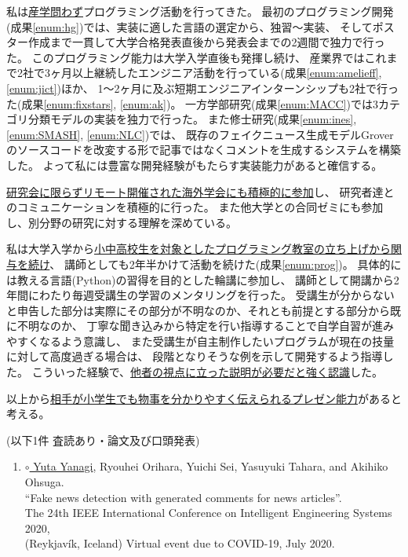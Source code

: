 私は\underline{産学問わず}プログラミング活動を行ってきた。
最初のプログラミング開発(成果\ref{enum:hg})では、実装に適した言語の選定から、独習〜実装、
そしてポスター作成まで一貫して大学合格発表直後から発表会までの2週間で独力で行った。
このプログラミング能力は大学入学直後も発揮し続け、
産業界ではこれまで2社で3ヶ月以上継続したエンジニア活動を行っている(成果\ref{enum:amelieff}, \ref{enum:jict})ほか、
1〜2ヶ月に及ぶ短期エンジニアインターンシップも2社で行った(成果\ref{enum:fixstars}, \ref{enum:ak})。
一方学部研究(成果\ref{enum:MACC})では3カテゴリ分類モデルの実装を独力で行った。
また修士研究(成果\ref{enum:ines}, \ref{enum:SMASH}, \ref{enum:NLC})では、
既存のフェイクニュース生成モデルGrover\cite{grover}のソースコードを改変する形で記事ではなくコメントを生成するシステムを構築した。
よって私には豊富な開発経験がもたらす実装能力があると確信する。

\underline{研究会に限らずリモート開催された海外学会にも積極的に参加}し、
研究者達とのコミュニケーションを積極的に行った。
また他大学との合同ゼミにも参加し、別分野の研究に対する理解を深めている。

私は大学入学から\underline{小中高校生を対象としたプログラミング教室の立ち上げから関与を続け}、
講師としても2年半かけて活動を続けた(成果\ref{enum:prog})。
具体的には教える言語(Python)の習得を目的とした輪講に参加し、
講師として開講から2年間にわたり毎週受講生の学習のメンタリングを行った。
受講生が分からないと申告した部分は実際にその部分が不明なのか、それとも前提とする部分から既に不明なのか、
丁寧な聞き込みから特定を行い指導することで自学自習が進みやすくなるよう意識し、
また受講生が自主制作したいプログラムが現在の技量に対して高度過ぎる場合は、
段階となりそうな例を示して開発するよう指導した。
こういった経験で、\underline{他者の視点に立った説明が必要だと強く認識}した。

以上から\underline{相手が小学生でも物事を分かりやすく伝えられるプレゼン能力}があると考える。

(以下1件 査読あり・論文及び口頭発表)
\vspace{-4mm}
\begin{enumerate}
    \setlength{\parskip}{0cm}
    \setlength{\itemsep}{0cm}
    \item \underline{$\circ$ Yuta Yanagi}, Ryouhei Orihara, Yuichi Sei, Yasuyuki Tahara, and Akihiko Ohsuga.\\
    ``Fake news detection with generated comments for news articles''.\\
    The 24th IEEE International Conference on Intelligent Engineering Systems 2020,\\
    (Reykjavík, Iceland) Virtual event due to COVID-19, July 2020. \label{enum:ines}
\end{enumerate}

